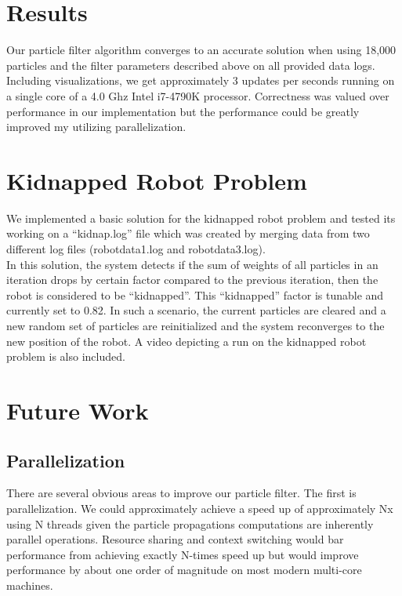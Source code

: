 \documentclass{article}
\begin{document}
\section{Results}

Our particle filter algorithm converges to an accurate solution when using 18,000 particles and the filter parameters described above on all provided data logs.  Including visualizations, we get approximately 3 updates per seconds running on a single core of a 4.0 Ghz Intel i7-4790K processor. Correctness was valued over performance in our implementation but the performance could be greatly improved my utilizing parallelization.


\section{Kidnapped Robot Problem}

We implemented a basic solution for the kidnapped robot problem and tested its working on a ``kidnap.log'' file which was created by merging data from two different log files (robotdata1.log and robotdata3.log). \\
In this solution, the system detects if the sum of weights of all particles in an iteration drops by certain factor compared to the previous iteration, then the robot is considered to be ``kidnapped''. This ``kidnapped'' factor is tunable and currently set to 0.82. In such a scenario, the current particles are cleared and a new random set of particles are reinitialized and the system reconverges to the new position of the robot. A video depicting a run on the kidnapped robot problem is also included.

\section{Future Work}

\subsection{Parallelization}
There are several obvious areas to improve our particle filter.  The first is parallelization. We could approximately achieve a speed up of approximately Nx using N threads given the particle propagations computations are inherently parallel operations. Resource sharing and context switching would bar performance from achieving exactly N-times speed up but would improve performance by about one order of magnitude on most modern multi-core machines.
\end{document}

